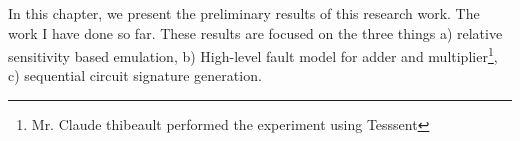 

In this chapter, we present the preliminary results of this research work. The work I have done so far. These results are focused on the three things a) relative sensitivity based emulation, b) High-level fault model for adder and multiplier\footnote{Mr. Claude thibeault performed the experiment using Tesssent }, c) sequential circuit signature generation.



